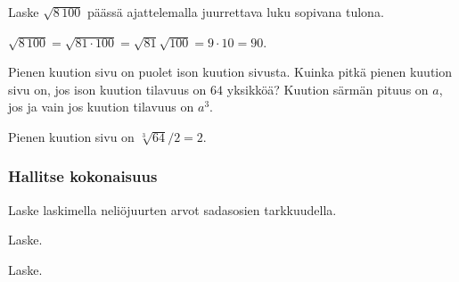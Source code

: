 \begin{tehtavasivu}
\begin{tehtava}
Laske $\sqrt{8\,100}$ päässä ajattelemalla juurrettava luku sopivana tulona.
	\begin{vastaus}
$\sqrt{8\,100}=\sqrt{81\cdot100}=\sqrt{81}\sqrt{100}=9\cdot 10=90$.
	\end{vastaus}
\end{tehtava}

\begin{tehtava}
Pienen kuution sivu on puolet ison kuution sivusta. Kuinka pitkä pienen kuution sivu on, jos ison kuution tilavuus on $64$ yksikköä? Kuution särmän pituus on $a$, jos ja vain jos kuution tilavuus on $a^3$.
	\begin{vastaus}
Pienen kuution sivu on $\sqrt[3]{64}/2=2$.
	\end{vastaus}
\end{tehtava}

\subsubsection*{Hallitse kokonaisuus}

\begin{tehtava}
Laske laskimella neliöjuurten arvot sadasosien tarkkuudella.
	\begin{vastaus}
	\end{vastaus}
\end{tehtava}

Laske.
\begin{tehtava}
	\begin{vastaus}
	\end{vastaus}
\end{tehtava}

\begin{tehtava} 
Laske. 
	\begin{vastaus}
	\end{vastaus}
\end{tehtava}


\end{tehtavasivu}
